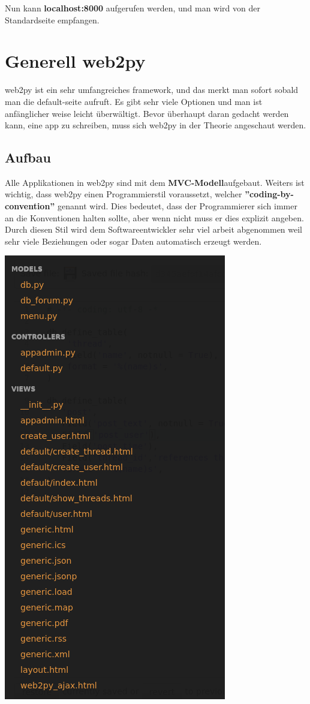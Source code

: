 Nun kann \textbf{localhost:8000} aufgerufen werden, und man wird von der Standardseite empfangen.

\section{Generell web2py}
web2py ist ein sehr umfangreiches framework, und das merkt man sofort sobald man die default-seite aufruft. Es gibt sehr viele Optionen und man ist anfänglicher weise leicht überwältigt. Bevor überhaupt daran gedacht werden kann, eine app zu schreiben, muss sich web2py in der Theorie angeschaut werden.

\subsection{Aufbau}
Alle Applikationen in web2py sind mit dem \textbf{MVC-Modell}aufgebaut. Weiters ist wichtig, dass web2py einen Programmierstil voraussetzt, welcher \textbf{''coding-by-convention''} genannt wird. Dies bedeutet, dass der Programmierer sich immer an die Konventionen halten sollte, aber wenn nicht muss er dies explizit angeben. Durch diesen Stil wird dem Softwareentwickler sehr viel arbeit abgenommen weil sehr viele Beziehungen oder sogar Daten automatisch erzeugt werden.

\begin{minipage}{\linewidth}
	\centering
	\includegraphics[width=0.45\linewidth]{images/aufbau}
\end{minipage}

